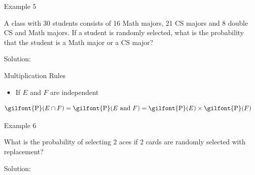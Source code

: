 \documentclass[
  ignorenonframetext,
]{beamer}
\providecommand{\tightlist}{%
  \setlength{\itemsep}{0pt}\setlength{\parskip}{0pt}}
\begin{document}
\begin{frame}{Example 5}
\protect\hypertarget{example-5}{}
\begin{tcolorbox}
A class with 30 students consists of 16 Math majors, 21 CS majors and 8 double CS and Math majors. If a student is randomly selected, what is the probability that the student is a Math major or a CS major?
\end{tcolorbox}

\begin{tcolorbox}
Solution:

\vspace{30mm}
\end{tcolorbox}
\end{frame}

\begin{frame}{Multiplication Rules}
\protect\hypertarget{multiplication-rules}{}
\begin{itemize}
\tightlist
\item
  If \(E\) and \(F\) are independent
\end{itemize}

\[\textrm{\gilfont{P}}\normalfont (E \cap F) =\textrm{\gilfont{P}}\normalfont (E \text{ and } F)= \textrm{\gilfont{P}}\normalfont (E)\times \textrm{\gilfont{P}}\normalfont (F)\]
\end{frame}

\begin{frame}{Example 6}
\protect\hypertarget{example-6}{}
\begin{tcolorbox}
What is the probability of selecting 2 aces if 2 cards are randomly selected with replacement?
\end{tcolorbox}

\begin{tcolorbox}
Solution:


\vspace{30mm}


\end{tcolorbox}
\end{frame}
\end{document}
